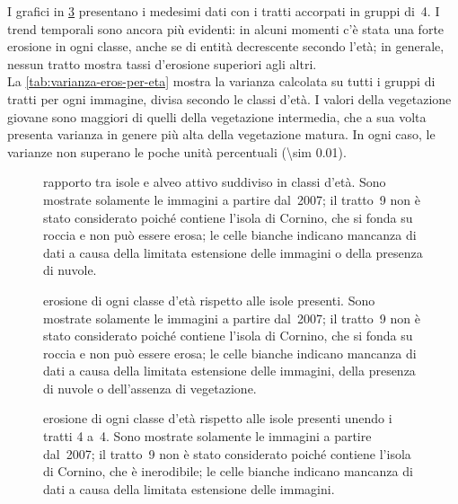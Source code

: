 I grafici in \cref{graph:erosione-classi-eta-4tr-matrix} presentano i medesimi dati con i tratti accorpati in gruppi di~4.
I trend temporali sono ancora più evidenti: in alcuni momenti c'è stata una forte erosione in ogni classe, anche se di entità decrescente secondo l'età; in generale, nessun tratto mostra tassi d'erosione superiori agli altri.
\\
La \cref{tab:varianza-eros-per-eta} mostra la varianza calcolata su tutti i gruppi di tratti per ogni immagine, divisa secondo le classi d'età.
I valori della vegetazione giovane sono maggiori di quelli della vegetazione intermedia, che a sua volta presenta varianza in genere più alta della vegetazione matura.
In ogni caso, le varianze non superano le poche unità percentuali (\num{\sim 0.01}).
%
\begin{figure}
	\centering
	
	\caption[rapporto tra isole e alveo attivo suddiviso in classi d'età]{rapporto tra isole e alveo attivo suddiviso in classi d'età.
	Sono mostrate solamente le immagini a partire dal~2007; il tratto~9 non è stato considerato poiché contiene l'isola di Cornino, che si fonda su roccia e non può essere erosa; le celle bianche indicano mancanza di dati a causa della limitata estensione delle immagini o della presenza di nuvole.}
	\label{graph:rapp-isl-classi-eta-matrix}
\end{figure}
%
%
\begin{figure}
	\centering
	
	\caption[erosione di ogni classe d'età rispetto alle isole presenti]{erosione di ogni classe d'età rispetto alle isole presenti.
	Sono mostrate solamente le immagini a partire dal~2007; il tratto~9 non è stato considerato poiché contiene l'isola di Cornino, che si fonda su roccia e non può essere erosa; le celle bianche indicano mancanza di dati a causa della limitata estensione delle immagini, della presenza di nuvole o dell'assenza di vegetazione.}
	\label{graph:erosione-classi-eta-matrix}
\end{figure}
%
%
\begin{figure}
	\centering
	
	\vspace*{-1cm}
	\caption[erosione di ogni classe d'età rispetto alle isole presenti unendo i tratti 4 a~4]{erosione di ogni classe d'età rispetto alle isole presenti unendo i tratti 4 a~4.
	Sono mostrate solamente le immagini a partire dal~2007; il tratto~9 non è stato considerato poiché contiene l'isola di Cornino, che è inerodibile; le celle bianche indicano mancanza di dati a causa della limitata estensione delle immagini.}
	\label{graph:erosione-classi-eta-4tr-matrix}
\end{figure}
